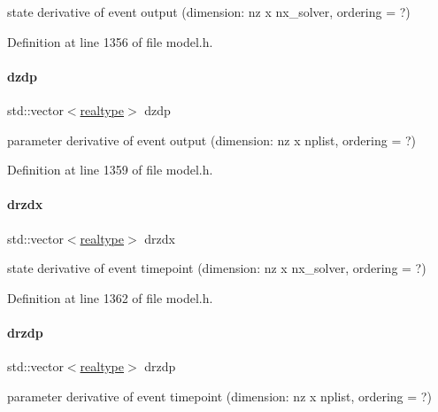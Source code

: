 state derivative of event output (dimension\+: nz x nx\+\_\+solver, ordering = ?) 

Definition at line 1356 of file model.\+h.

\mbox{\label{classamici_1_1_model_a5d743131ef6be8aa56865fd100acd137}} 
\paragraph{\texorpdfstring{dzdp}{dzdp}}
{\footnotesize\ttfamily std\+::vector$<$\mbox{\hyperlink{namespaceamici_a1bdce28051d6a53868f7ccbf5f2c14a3}{realtype}}$>$ dzdp\hspace{0.3cm}{\ttfamily [protected]}}

parameter derivative of event output (dimension\+: nz x nplist, ordering = ?) 

Definition at line 1359 of file model.\+h.

\mbox{\label{classamici_1_1_model_acf722ef69da2112dc1c61d55c4e359ca}} 
\paragraph{\texorpdfstring{drzdx}{drzdx}}
{\footnotesize\ttfamily std\+::vector$<$\mbox{\hyperlink{namespaceamici_a1bdce28051d6a53868f7ccbf5f2c14a3}{realtype}}$>$ drzdx\hspace{0.3cm}{\ttfamily [protected]}}

state derivative of event timepoint (dimension\+: nz x nx\+\_\+solver, ordering = ?) 

Definition at line 1362 of file model.\+h.

\mbox{\label{classamici_1_1_model_af996feb03ef94b432683ea74277cc4a8}} 
\paragraph{\texorpdfstring{drzdp}{drzdp}}
{\footnotesize\ttfamily std\+::vector$<$\mbox{\hyperlink{namespaceamici_a1bdce28051d6a53868f7ccbf5f2c14a3}{realtype}}$>$ drzdp\hspace{0.3cm}{\ttfamily [protected]}}

parameter derivative of event timepoint (dimension\+: nz x nplist, ordering = ?) 

